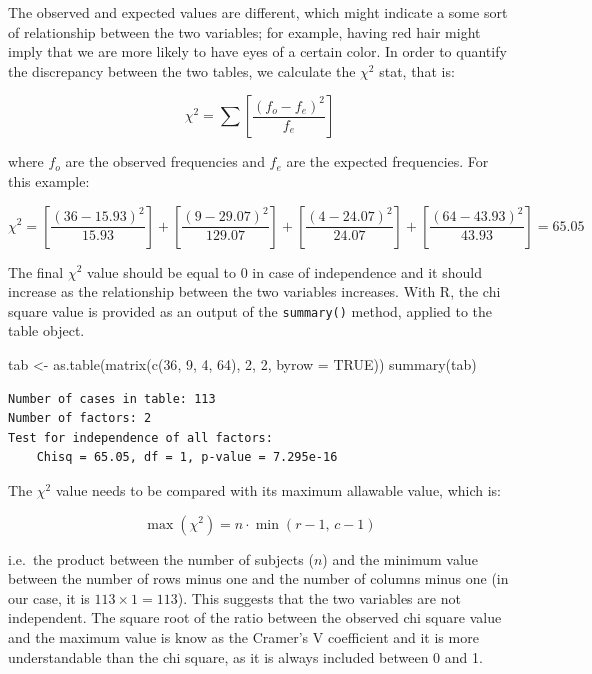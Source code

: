 \documentclass[
  letterpaper,
  DIV=11,
  numbers=noendperiod]{scrreprt}
\newenvironment{Shaded}{\begin{snugshade}}{\end{snugshade}}
\newcommand{\AttributeTok}[1]{\textcolor[rgb]{0.40,0.45,0.13}{#1}}
\newcommand{\ConstantTok}[1]{\textcolor[rgb]{0.56,0.35,0.01}{#1}}
\newcommand{\DecValTok}[1]{\textcolor[rgb]{0.68,0.00,0.00}{#1}}
\newcommand{\FunctionTok}[1]{\textcolor[rgb]{0.28,0.35,0.67}{#1}}
\newcommand{\NormalTok}[1]{\textcolor[rgb]{0.00,0.23,0.31}{#1}}
\newcommand{\OtherTok}[1]{\textcolor[rgb]{0.00,0.23,0.31}{#1}}
\begin{document}
The observed and expected values are different, which might indicate a
some sort of relationship between the two variables; for example, having
red hair might imply that we are more likely to have eyes of a certain
color. In order to quantify the discrepancy between the two tables, we
calculate the \(\chi^2\) stat, that is:

\[\chi ^2  = \sum \left[ \frac{\left( {f_o  - f_e } \right)^2 }{f_e } \right]\]

where \(f_o\) are the observed frequencies and \(f_e\) are the expected
frequencies. For this example:

\[\chi ^2  = \left[ \frac{\left( {36  - 15.93 } \right)^2 }{15.93} \right] + \left[ \frac{\left( {9  - 29.07 } \right)^2 }{129.07} \right] +\left[ \frac{\left( {4  - 24.07 } \right)^2 }{24.07 } \right] + \left[ \frac{\left( {64  - 43.93 } \right)^2 }{43.93 } \right] = 65.05\]

The final \(\chi^2\) value should be equal to 0 in case of independence
and it should increase as the relationship between the two variables
increases. With R, the chi square value is provided as an output of the
\texttt{summary()} method, applied to the table object.

\begin{Shaded}
\begin{Highlighting}[]
\NormalTok{tab }\OtherTok{\textless{}{-}} \FunctionTok{as.table}\NormalTok{(}\FunctionTok{matrix}\NormalTok{(}\FunctionTok{c}\NormalTok{(}\DecValTok{36}\NormalTok{, }\DecValTok{9}\NormalTok{, }\DecValTok{4}\NormalTok{, }\DecValTok{64}\NormalTok{), }\DecValTok{2}\NormalTok{, }\DecValTok{2}\NormalTok{, }\AttributeTok{byrow =} \ConstantTok{TRUE}\NormalTok{))}
\FunctionTok{summary}\NormalTok{(tab)}
\end{Highlighting}
\end{Shaded}

\begin{verbatim}
Number of cases in table: 113 
Number of factors: 2 
Test for independence of all factors:
    Chisq = 65.05, df = 1, p-value = 7.295e-16
\end{verbatim}

The \(\chi^2\) value needs to be compared with its maximum allawable
value, which is:

\[\max \left( \chi ^2 \right)  = n \cdot \min (r - 1,\,c - 1)\]

i.e.~the product between the number of subjects (\(n\)) and the minimum
value between the number of rows minus one and the number of columns
minus one (in our case, it is \(113 \times 1 = 113\)). This suggests
that the two variables are not independent. The square root of the ratio
between the observed chi square value and the maximum value is know as
the Cramer's V coefficient and it is more understandable than the chi
square, as it is always included between 0 and 1.
\end{document}
